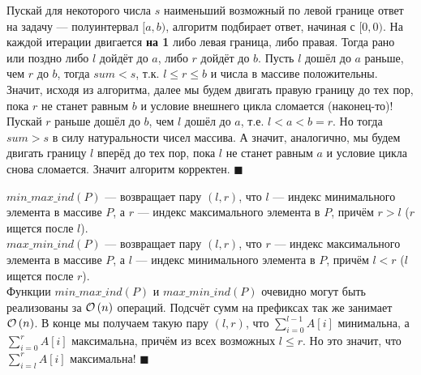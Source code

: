 Пускай для некоторого числа $s$ наименьший возможный по левой границе ответ на задачу --- полуинтервал $[a, b)$, 
алгоритм подбирает ответ, начиная с $[0, 0)$. На каждой итерации двигается \textbf{на 1} либо левая граница, либо правая.
Тогда рано или поздно либо $l$ дойдёт до $a$, либо $r$ дойдёт до $b$. Пусть $l$ дошёл до $a$ раньше, чем $r$ до $b$, тогда
$sum < s$, т.к. $l \leq r \leq b$ и числа в массиве положительны. Значит, исходя из алгоритма, далее мы будем двигать правую
границу до тех пор, пока $r$ не станет равным $b$ и условие внешнего цикла сломается (наконец-то)! Пускай $r$ раньше дошёл
до $b$, чем $l$ дошёл до $a$, т.е. $l < a < b = r$. Но тогда $sum > s$ в силу натуральности чисел массива. А значит, аналогично,
мы будем двигать границу $l$ вперёд до тех пор, пока $l$ не станет равным $a$ и условие цикла снова сломается. Значит
алгоритм корректен. \hfill $\blacksquare$ 

\begin{algorithmic}[1]
\EndFor
{}
\Else
\EndIf
\end{algorithmic}
$min\_max\_ind(P)$ --- возвращает пару $(l, r)$, что $l$ --- индекс минимального элемента в массиве $P$, а $r$ --- индекс
максимального элемента в $P$, причём $r > l$ ($r$ ищется после $l$).\\
$max\_min\_ind(P)$ --- возвращает пару $(l, r)$, что $r$ --- индекс максимального элемента в массиве $P$, а $l$ --- индекс
минимального элемента в $P$, причём $l < r$ ($l$ ищется после $r$).\\


Функции $min\_max\_ind(P)$ и $max\_min\_ind(P)$ очевидно могут быть реализованы за $\mathcal{O}\left(n\right)$ операций. Подсчёт сумм на
префиксах так же занимает $\mathcal{O}\left(n\right)$. В конце мы получаем такую пару $(l, r)$, что $\sum_{i=0}^{l-1}{A[i]}$ минимальна,
а $\sum_{i=0}^{r}{A[i]}$ максимальна, причём из всех возможных $l \leq r$. Но это значит, что $\sum_{i=l}^{r}{A[i]}$
максимальна! \hfill $\blacksquare$
